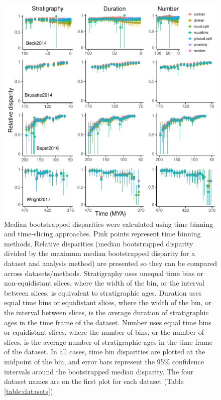 \documentclass[12pt,a4paper]{article}
\begin{document}
  \begin{figure}[!htbp]
    \centering
    \includegraphics[width=1\linewidth, height=1\textheight, keepaspectratio]{figures/fig-dtt-age-appendix.pdf}
    \caption[Relative disparity through time for four example datasets.]
    {Median bootstrapped disparities were calculated using time binning and time-slicing approaches. 
    Pink points represent time binning methods, 
    Relative disparities (median bootstrapped disparity divided by the maximum median bootstrapped disparity for a dataset and analysis method) are presented so they can be compared across datasets/methods. 
    Stratigraphy uses unequal time bins or non-equidistant slices, where the width of the bin, or the interval between slices, is equivalent to stratigraphic ages. 
    Duration uses equal time bins or equidistant slices, where the width of the bin, or the interval between slices, is the average duration of stratigraphic ages in the time frame of the dataset. 
    Number uses equal time bins or equidistant slices, where the number of bins, or the number of slices, is the average number of stratigraphic ages in the time frame of the dataset. 
    In all cases, time bin disparities are plotted at the midpoint of the bin, and error bars represent the 95\% confidence intervals around the bootstrapped median disparity.
    The four dataset names are on the first plot for each dataset (Table \ref{table:datasets}).}
    \label{figure:dtt3}
  \end{figure}  
\end{document}

